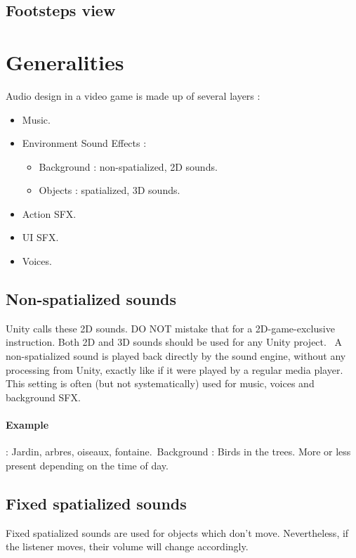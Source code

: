 \documentclass[a4paper,10pt]{article}
\begin{document}
\subsection{Footsteps view}



\section{Generalities} \label{sec:gen}

Audio design in a video game is made up of several layers : \begin{itemize}
\item Music.
\item Environment Sound Effects : 
	\begin{itemize}
	\item Background : non-spatialized, 2D sounds.
	\item Objects : spatialized, 3D sounds.
	\end{itemize}
\item Action SFX.
\item UI SFX.
\item Voices.
\end{itemize}


\subsection{Non-spatialized sounds}
Unity calls these 2D sounds. DO NOT mistake that for a 2D-game-exclusive instruction. Both 2D and 3D sounds should be used for any Unity project. \
A non-spatialized sound is played back directly by the sound engine, without any processing from Unity, exactly like if it were played by a regular media player. This setting is often (but not systematically) used for music, voices and background SFX. \\

\paragraph{Example} : Jardin, arbres, oiseaux, fontaine.\
Background : Birds in the trees. More or less present depending on the time of day.


\subsection{Fixed spatialized sounds}
Fixed spatialized sounds are used for objects which don't move. Nevertheless, if the listener moves, their volume will change accordingly.
\end{document}
